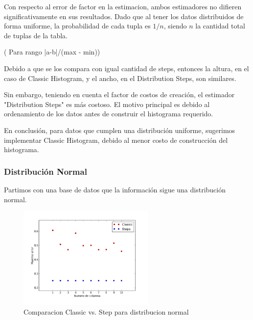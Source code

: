 \documentclass[10pt, a4paper,english,spanish,hidelinks]{article}
\begin{document}
Con respecto al error de factor en la estimacion, ambos estimadores no difieren significativamente en sus resultados. Dado que 
al tener los datos distribuidos de forma uniforme, la probabilidad de cada tupla es $1/n$, siendo $n$ la cantidad total de tuplas de la tabla. 

( Para rango |a-b|/(max - min))


Debido a que se los compara con igual cantidad de steps, entonces la altura, en el caso de Classic Histogram, y el ancho, en el Distribution Steps, son similares.

Sin embargo, teniendo en cuenta el factor de costos de creación, el estimador "Distribution Steps" es más costoso. El motivo principal es debido al ordenamiento de los datos antes de construir el histograma requerido.

En conclusión, para datos que cumplen una distribución uniforme, sugerimos implementar Classic Histogram, debido al menor costo de construcción del histograma.


\subsubsection{Distribución Normal}

Partimos con una base de datos que la información sigue una distribución normal.

\begin{figure}[h!]
  \centering
  \includegraphics[width=0.6\textwidth]{./imagenes/ejb1_normal.png}
  \caption{Comparacion Classic vs. Step para distribucion normal}
\end{figure}
\end{document}
